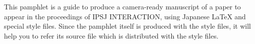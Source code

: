
\begin{abstract}
このパンフレットは，インタラクションシンポジウムに投稿する予稿
を，日本語 {\LaTeX} を用いて作成し提出するための
ガイドである．このパンフレットでは，予稿作成のためのスタイルファイルにつ
いて解説している．また，このパンフレット自体も予稿と同じ方法で作成されて
いるので，必要に応じてスタイルファイルとともに配布するソース・ファイルを
参照されたい．なお、このスタイルファイルは情報処理学会論文誌のスタイルファ
イルと同じコマンドを用いている．したがって，基本的には，スタイルファイル
を情報処理学会論文誌用のものに替えるのみで，シンポジウム用原稿から論文誌
用原稿を簡単に作成できる．ご活用されたい．
\end{abstract}

\begin{eabstract}
This pamphlet is a guide to produce a camera-ready 
manuscript of a paper to appear
in the proceedings of IPSJ INTERACTION, using Japanese {\LaTeX} and
special style files.  Since the pamphlet itself is produced with the
style files, it will help you to refer its source file which is
distributed with the style files. 
\end{eabstract}
